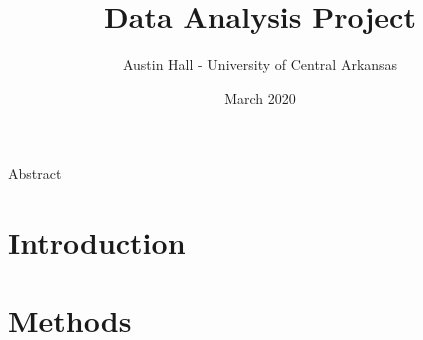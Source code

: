 \documentclass{article}
\author{Austin Hall - University of Central Arkansas}
\date{March 2020}
\title{\huge Data Analysis Project}
\begin{document}
\maketitle
\begin{center}
{\LARGE Abstract}\\
\end{center}

\newpage
\section{Introduction}


\newpage
\section{Methods}


\newpage
\end{document}
